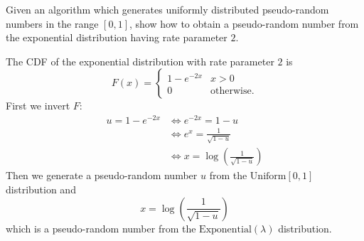 \begin{example}
Given an algorithm which generates uniformly distributed pseudo-random numbers in the range $[0,1]$, show how to obtain a pseudo-random number from the exponential distribution having rate parameter $2$.
\begin{solution}
The CDF of the exponential distribution with rate parameter $2$ is
\[
F(x) = \begin{cases}
	1 - e^{-2x}	& x>0 \\
	0			& \text{otherwise.}
\end{cases}	
\]
First we invert $F$:
\begin{align*}
u = 1 - e^{-2x} 
	& \iff e^{-2x} = 1-u \\
	& \iff e^x = \frac{1}{\sqrt{1-u}} \\
	& \iff x = \log\left(\frac{1}{\sqrt{1-u}}\right)
\end{align*}
Then we generate a pseudo-random number $u$ from the $\text{Uniform}[0,1]$ distribution and
\[
x = \log\left(\frac{1}{\sqrt{1-u}}\right)
\]
which is a pseudo-random number from the $\text{Exponential}(\lambda)$ distribution.
\end{solution}
\end{example}



